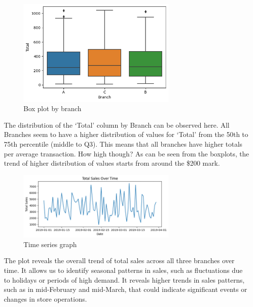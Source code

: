 \begin{figure}[h]
    \centering
    \includegraphics[width=0.7\textwidth]{Chapters/ch3/ch_3_boxplot.png}
    \caption{Box plot by branch}
\end{figure}
The distribution of the ‘Total’ column by Branch can be observed here. All Branches seem to have a higher distribution of values for ‘Total’ from the 50th to 75th percentile (middle to Q3). This means that all branches have higher totals per average transaction. How high though? As can be seen from the boxplots, the trend of higher distribution of values starts from around the \$200 mark. 

\begin{figure}[h]
    \centering
    \includegraphics[width=0.7\textwidth]{Chapters/ch3/tim_s_1.png}
    \caption{Time series graph}
\end{figure}
The plot reveals the overall trend of total sales across all three branches over time. It allows us to identify seasonal patterns in sales, such as fluctuations due to holidays or periods of high demand. It reveals higher trends in sales patterns, such as in mid-February and mid-March, that could indicate significant events or changes in store operations.

